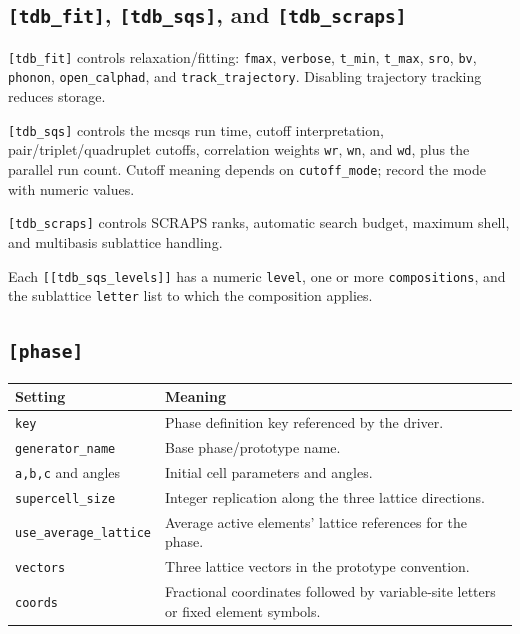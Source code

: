 \documentclass[11pt,letterpaper]{article}
\newcommand{\setting}[1]{\nolinkurl{#1}}
\begin{document}
\subsection{\texttt{[tdb\_fit]}, \texttt{[tdb\_sqs]}, and \texttt{[tdb\_scraps]}}

\setting{[tdb_fit]} controls relaxation/fitting: \setting{fmax},
\setting{verbose}, \setting{t_min}, \setting{t_max}, \setting{sro},
\setting{bv}, \setting{phonon}, \setting{open_calphad}, and
\setting{track_trajectory}. Disabling trajectory tracking reduces storage.

\begin{sloppypar}
\setting{[tdb_sqs]} controls the mcsqs run time,
cutoff interpretation, pair/triplet/quadruplet cutoffs, correlation weights
\setting{wr}, \setting{wn}, and \setting{wd}, plus the parallel run count. Cutoff meaning
depends on \setting{cutoff_mode}; record the mode with numeric values.
\end{sloppypar}

\setting{[tdb_scraps]} controls SCRAPS ranks, automatic search budget,
maximum shell, and multibasis sublattice handling.

Each \setting{[[tdb_sqs_levels]]} has a numeric \setting{level}, one or more
\setting{compositions}, and the sublattice \setting{letter} list to which the
composition applies.

\subsection{\texttt{[phase]}}

\begin{longtable}{p{}p{}}
\toprule
Setting & Meaning \\
\midrule
\endhead
\setting{key} & Phase definition key referenced by the driver. \\
\setting{generator_name} & Base phase/prototype name. \\
\setting{a,b,c} and angles & Initial cell parameters and angles. \\
\setting{supercell_size} & Integer replication along the three lattice directions. \\
\setting{use_average_lattice} & Average active elements' lattice references for the phase. \\
\setting{vectors} & Three lattice vectors in the prototype convention. \\
\setting{coords} & Fractional coordinates followed by variable-site letters or fixed element symbols. \\
\bottomrule
\end{longtable}
\end{document}
